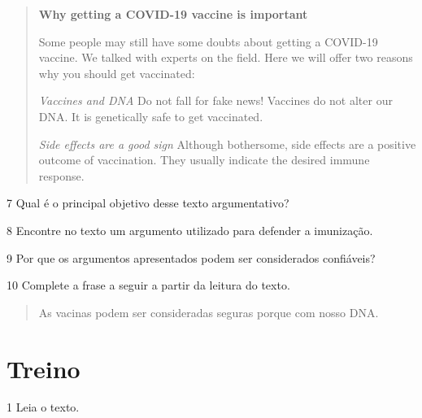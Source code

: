 \begin{quote}
\textbf{Why getting a COVID-19 vaccine is important}

Some people may still have some doubts about getting a COVID-19 vaccine. We talked with experts on the field. Here we will offer two reasons why you should get vaccinated:

\textit{Vaccines and DNA}
Do not fall for fake news! Vaccines do not alter our DNA. It is genetically safe to get vaccinated.

\textit{Side effects are a good sign}
Although bothersome, side effects are a positive outcome of vaccination. They usually indicate the desired immune response.

\end{quote}

\num{7} Qual é o principal objetivo desse texto argumentativo?



\num{8} Encontre no texto um argumento utilizado para defender a
imunização.



\num{9} Por que os argumentos apresentados podem ser considerados
confiáveis?



\num{10} Complete a frase a seguir a partir da leitura do texto.

\begin{quote}
As vacinas podem ser consideradas seguras porque  com nosso DNA.
\end{quote}

\section*{Treino}

\num{1} Leia o texto.

